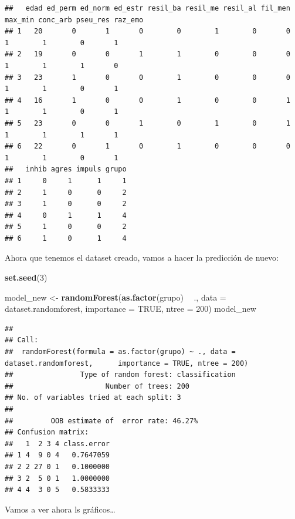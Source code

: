 \documentclass[]{article}
\newenvironment{Shaded}{\begin{snugshade}}{\end{snugshade}}
\newcommand{\KeywordTok}[1]{\textcolor[rgb]{0.13,0.29,0.53}{\textbf{#1}}}
\newcommand{\DataTypeTok}[1]{\textcolor[rgb]{0.13,0.29,0.53}{#1}}
\newcommand{\DecValTok}[1]{\textcolor[rgb]{0.00,0.00,0.81}{#1}}
\newcommand{\StringTok}[1]{\textcolor[rgb]{0.31,0.60,0.02}{#1}}
\newcommand{\OtherTok}[1]{\textcolor[rgb]{0.56,0.35,0.01}{#1}}
\newcommand{\OperatorTok}[1]{\textcolor[rgb]{0.81,0.36,0.00}{\textbf{#1}}}
\newcommand{\NormalTok}[1]{#1}
\begin{document}
\begin{verbatim}
##   edad ed_perm ed_norm ed_estr resil_ba resil_me resil_al fil_men max_min conc_arb pseu_res raz_emo
## 1   20       0       1       0        0        1        0       0       1        1        0       1
## 2   19       0       0       1        1        0        0       0       1        1        1       0
## 3   23       1       0       0        1        0        0       0       1        1        0       1
## 4   16       1       0       0        1        0        0       1       1        1        0       1
## 5   23       0       0       1        0        1        0       1       1        1        1       1
## 6   22       0       1       0        1        0        0       0       1        1        0       1
##   inhib agres impuls grupo
## 1     0     1      1     1
## 2     1     0      0     2
## 3     1     0      0     2
## 4     0     1      1     4
## 5     1     0      0     2
## 6     1     0      1     4
\end{verbatim}

Ahora que tenemos el dataset creado, vamos a hacer la predicción de
nuevo:

\begin{Shaded}
\begin{Highlighting}[]
\KeywordTok{set.seed}\NormalTok{(}\DecValTok{3}\NormalTok{)}

\NormalTok{model_new <-}\StringTok{ }\KeywordTok{randomForest}\NormalTok{(}\KeywordTok{as.factor}\NormalTok{(grupo) }\OperatorTok{~}\StringTok{ }\NormalTok{., }\DataTypeTok{data =}\NormalTok{ dataset.randomforest, }\DataTypeTok{importance =} \OtherTok{TRUE}\NormalTok{, }\DataTypeTok{ntree =} \DecValTok{200}\NormalTok{)}
\NormalTok{model_new}
\end{Highlighting}
\end{Shaded}

\begin{verbatim}
## 
## Call:
##  randomForest(formula = as.factor(grupo) ~ ., data = dataset.randomforest,      importance = TRUE, ntree = 200) 
##                Type of random forest: classification
##                      Number of trees: 200
## No. of variables tried at each split: 3
## 
##         OOB estimate of  error rate: 46.27%
## Confusion matrix:
##   1  2 3 4 class.error
## 1 4  9 0 4   0.7647059
## 2 2 27 0 1   0.1000000
## 3 2  5 0 1   1.0000000
## 4 4  3 0 5   0.5833333
\end{verbatim}

Vamos a ver ahora ls gráficos\ldots{}
\end{document}
